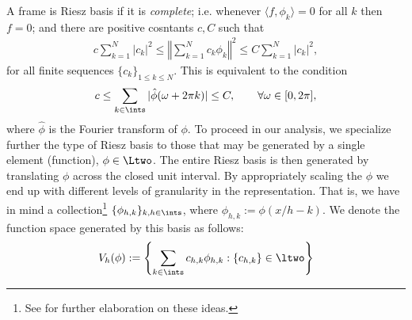 \noindent A frame is Riesz basis if it is \emph{complete}; i.e. whenever $\langle f,\phi_k\rangle = 0$ for all $k$ then $f =0$; and there are positive cosntants $c,C$ such that 
\begin{align}
  c\sum_{k=1}^N\vert c_k\vert^2 \le \left\Vert \sum_{k =1}^N c_k \phi_k \right \Vert^2 \le C\sum_{k=1}^N\vert c_k\vert^2,
  \label{}
\end{align}
for all finite sequences $\{c_k\}_{1\le k\le N}$. This is equivalent to the condition
\begin{align}
  c\le \sumi \vert\hat{\phi}(\omega + 2 \pi k)\vert \le C, \qquad \forall\omega \in [0,2\pi], 
  \label{}
\end{align}
where $\hat{\phi}$ is the Fourier transform of $\phi$. 
To proceed in our analysis, we specialize further the type of Riesz basis to those that may be generated by a single element (function), $\phi \in \Ltwo$.  The entire Riesz basis is then generated by translating $\phi$ across the closed unit interval. By appropriately scaling the $\phi$ we end up with different levels of granularity in the representation. That is, we have in mind a collection\footnote{See \cite{Unser1997} for further elaboration on these ideas.} $\{\phi_{h,k}\}_{k, h \in \ints}$, where $\phi_{h,k} :=  \phi(x/h - k)$. We denote the function space generated by this basis as follows:
\begin{align}
  V_h(\phi) := \left\{\sumi c_{h,k} \phi_{h,k} : \{c_{h,k}\} \in \ltwo\right\}
  \label{}
\end{align}
